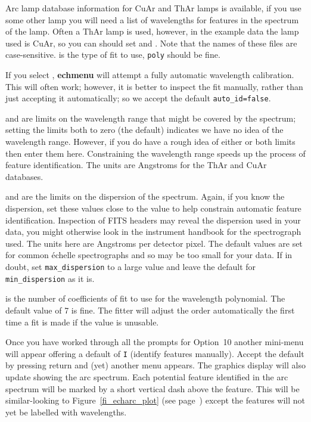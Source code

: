 \documentclass[twoside,11pt]{starlink}
\providecommand{\scspec}[2]{#1}
\begin{document}
Arc lamp database information for CuAr and ThAr lamps is available,
if you use some other lamp you will need a list of wavelengths for
features in the spectrum of the lamp.  Often a ThAr lamp is used,
however, in the example data the lamp used is CuAr,
so you can should set
 and
\@.
Note that the names of these files are case-sensitive.
 is the type of fit to use,
\verb+poly+ should be fine.

If you select
,
\textbf{echmenu} will attempt a fully automatic wavelength calibration.
This will often work; however, it is better to
inspect the fit manually, rather than just accepting it automatically;
so we accept the default \verb+auto_id=false+\@.

 and
 are limits on the wavelength
range that might be covered by the spectrum; setting the limits both to
zero (the default) indicates we have no idea of the wavelength range.
However, if you do have a rough idea of either or both limits then enter
them here.
Constraining the wavelength range speeds up the process of feature
identification.
The units are Angstroms for the ThAr and CuAr databases.

 and
 are the limits on the
dispersion of the spectrum.  Again, if you know the dispersion, set these
values close to the value to help constrain automatic feature identification.
Inspection of FITS headers may reveal the dispersion used in your data,
you might otherwise look in the instrument handbook for the spectrograph
used.
The units here are Angstroms per detector pixel.  The default values are
set for common \'{e}chelle spectrographs and so may be too small for your
data.  If in doubt, set \verb+max_dispersion+ to a large value and leave
the default for \verb+min_dispersion+ as it is.

 is the number of coefficients
of fit to use for the wavelength polynomial.
The default value of 7 is fine.
The fitter will adjust the order automatically the first time a fit is
made if the value is unusable.




Once you have worked through all the prompts for Option~10 another mini-menu
will appear offering a default of \verb+I+ (identify features manually).
Accept the default by pressing return and (yet) another menu appears.  The
graphics display will also update showing the arc spectrum.  Each potential
feature identified in the arc spectrum will be marked by a short vertical
dash above the feature.  This will be similar-looking to
\scspec{Figure~\ref{fi_echarc_plot} (see page~\pageref{fi_echarc_plot})}
{the figure above,} except the features
will not yet be labelled with wavelengths.
\end{document}
